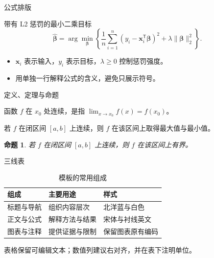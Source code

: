 \documentclass[10pt,aspectratio=169]{beamer}
\newtheorem{proposition}{命题}
\begin{document}
\begin{frame}{公式排版}
  \begin{block}{带有 L2 惩罚的最小二乘目标}
    \[
      \hat{\bm\beta}
      =\arg\min_{\bm\beta}\left\{
        \frac{1}{n}\sum_{i=1}^{n}(y_i-\bm{x}_i^{\mathsf T}\bm\beta)^2
        +\lambda\lVert\bm\beta\rVert_2^2\right\}.
    \]
  \end{block}
  \medskip
  \begin{itemize}\setlength{\itemsep}{.65em}
    \item $\bm{x}_i$ 表示输入，$y_i$ 表示目标，$\lambda\geq0$ 控制惩罚强度。
    \item 用单独一行解释公式的含义，避免只展示符号。
  \end{itemize}
\end{frame}

\begin{frame}{定义、定理与命题}
  \begin{definition}[连续函数]
    函数 $f$ 在 $x_0$ 处连续，是指 $\lim_{x\to x_0}f(x)=f(x_0)$。
  \end{definition}
  \begin{theorem}[最值定理]
    若 $f$ 在闭区间 $[a,b]$ 上连续，则 $f$ 在该区间上取得最大值与最小值。
  \end{theorem}
  \begin{proposition}
    若 $f$ 在闭区间 $[a,b]$ 上连续，则 $f$ 在该区间上有界。
  \end{proposition}
\end{frame}

\begin{frame}{三线表}
  \begin{table}
    \centering
    \caption{模板的常用组成}
    \renewcommand{\arraystretch}{1.45}
    \begin{tabularx}{.94\linewidth}{@{}lYY@{}}
      \toprule
      \textbf{组成} & \textbf{主要用途} & \textbf{样式}\\
      \midrule
      标题与导航 & 组织内容层次 & 北洋蓝与白色\\
      正文与公式 & 解释方法与结果 & 宋体与衬线英文\\
      图表与注释 & 提供证据与限制 & 保留图表原有编码\\
      \bottomrule
    \end{tabularx}
  \end{table}
  \medskip
  {\small 表格保留可编辑文本；数值列建议右对齐，并在表下注明单位。}
\end{frame}
\end{document}
